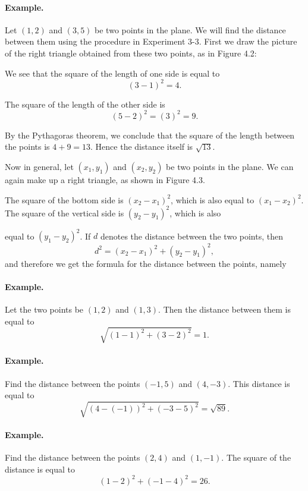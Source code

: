 \documentclass[12pt]{book} %
\begin{document}
\paragraph{Example.}
Let $(1,2)$ and $(3,5)$ be two points in the plane. We will find the distance between them using the procedure in Experiment 3-3. First we draw the picture of the right triangle obtained from these two points, as in Figure 4.2:


We see that the square of the length of one side is equal to
\[
(3-1)^2=4.
\]

The square of the length of the other side is
\[
(5-2)^2=(3)^2=9.
\]

By the Pythagoras theorem, we conclude that the square of the length between the points is $4+9=13$. Hence the distance itself is $\sqrt{13}$.

Now in general, let $(x_1,y_1)$ and $(x_2,y_2)$ be two points in the plane. We can again make up a right triangle, as shown in Figure 4.3.


The square of the bottom side is $(x_2-x_1)^2$, which is also equal to $(x_1-x_2)^2$. The square of the vertical side is $(y_2-y_1)^2$, which is also

equal to $(y_1-y_2)^2$. If $d$ denotes the distance between the two points, then
\[
d^2=(x_2-x_1)^2+(y_2-y_1)^2,
\]
and therefore we get the formula for the distance between the points, namely


\paragraph{Example.}
Let the two points be $(1,2)$ and $(1,3)$. Then the distance between them is equal to
\[
\sqrt{(1-1)^2+(3-2)^2}=1.
\]

\paragraph{Example.}
Find the distance between the points $(-1,5)$ and $(4,-3)$. This distance is equal to
\[
\sqrt{(4-(-1))^2+(-3-5)^2}=\sqrt{89}.
\]

\paragraph{Example.}
Find the distance between the points $(2,4)$ and $(1,-1)$. The square of the distance is equal to
\[
(1-2)^2+(-1-4)^2=26.
\]
\end{document}
